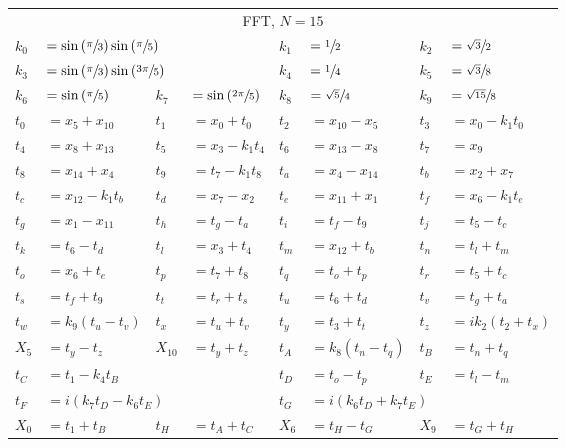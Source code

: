 \begin{tabular}{|p{4.3pt}l|p{4.3pt}l|p{4.3pt}l|p{4.3pt}l|}\toprule \multicolumn{8}{|c|}{FFT, $N=15$} \\
$k_0 $ &\multicolumn{3}{l|}{$= \sin\left(\sfrac{\pi}{3}\right)\sin\left(\sfrac{\pi}{5}\right)$} & $k_1 $ &$= \sfrac{1}{2}$ & $k_2 $ &$= \sfrac{\sqrt{3}}{2}$\\ 
$k_3 $ &\multicolumn{3}{l|}{$= \sin\left(\sfrac{\pi}{3}\right)\sin\left(\sfrac{3\pi}{5}\right)$} & $k_4 $ &$= \sfrac{1}{4}$ & $k_5 $ &$= \sfrac{\sqrt{3}}{8}$\\ 
$k_6 $ &$= \sin\left(\sfrac{\pi}{5}\right)$ & $k_7 $ &$= \sin\left(\sfrac{2\pi}{5}\right)$ & $k_8 $ &$= \sfrac{\sqrt{5}}{4}$ & $k_9 $ &$= \sfrac{\sqrt{15}}{8}$\\ 
$t_0 $ &$= x_5 + x_{10}$ & $t_1 $ &$= x_0 + t_0$ & $t_2 $ &$= x_{10} - x_5$ & $t_3 $ &$= x_0 - k_1t_0$\\ 
$t_4 $ &$= x_8 + x_{13}$ & $t_5 $ &$= x_3 - k_1t_4$ & $t_6 $ &$= x_{13} - x_8$ & $t_7 $ &$= x_9$\\ 
$t_8 $ &$= x_{14} + x_4$ & $t_9 $ &$= t_7 - k_1t_8$ & $t_a $ &$= x_4 - x_{14}$ & $t_b $ &$= x_2 + x_7$\\ 
$t_c $ &$= x_{12} - k_1t_b$ & $t_d $ &$= x_7 - x_2$ & $t_e $ &$= x_{11} + x_1$ & $t_f $ &$= x_6 - k_1t_e$\\ 
$t_g $ &$= x_1 - x_{11}$ & $t_h $ &$= t_g - t_a$ & $t_i $ &$= t_f - t_9$ & $t_j $ &$= t_5 - t_c$\\ 
$t_k $ &$= t_6 - t_d$ & $t_l $ &$= x_3 + t_4$ & $t_m $ &$= x_{12} + t_b$ & $t_n $ &$= t_l + t_m$\\ 
$t_o $ &$= x_6 + t_e$ & $t_p $ &$= t_7 + t_8$ & $t_q $ &$= t_o + t_p$ & $t_r $ &$= t_5 + t_c$\\ 
$t_s $ &$= t_f + t_9$ & $t_t $ &$= t_r + t_s$ & $t_u $ &$= t_6 + t_d$ & $t_v $ &$= t_g + t_a$\\ 
$t_w $ &$= k_9(t_u - t_v)$ & $t_x $ &$= t_u + t_v$ & $t_y $ &$= t_3 + t_t$ & $t_z $ &$= ik_2(t_2 + t_x)$\\ 
$X_5 $ &$= t_y - t_z$ & $X_{10} $ &$= t_y + t_z$ & $t_A $ &$= k_8(t_n - t_q)$ & $t_B $ &$= t_n + t_q$\\ 
$t_C $ &\multicolumn{3}{l|}{$= t_1 - k_4t_B$} & $t_D $ &$= t_o - t_p$ & $t_E $ &$= t_l - t_m$\\ 
$t_F $ &\multicolumn{3}{l|}{$= i(k_7t_D - k_6t_E)$} & $t_G $ &\multicolumn{3}{l|}{$= i(k_6t_D + k_7t_E)$}\\ 
$X_0 $ &$= t_1 + t_B$ & $t_H $ &$= t_A + t_C$ & $X_6 $ &$= t_H - t_G$ & $X_9 $ &$= t_G + t_H$\\ 

\end{tabular}
